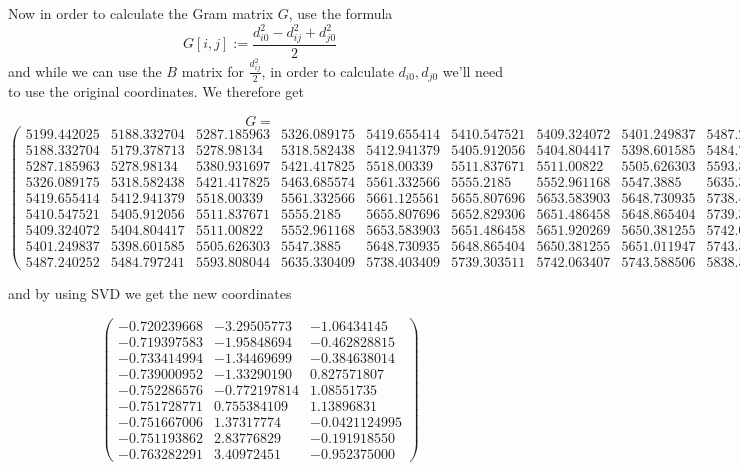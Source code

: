 \documentclass[a4paper,11pt]{article}
\begin{document}
Now in order to calculate the Gram matrix $G$, use the formula
\[
  G[i,j] := \frac{d_{i0}^2 - d_{ij}^2 + d_{j0}^2}{2}
\]
and while we can use the $B$ matrix for $\frac{d_{ij}^2}{2}$, in order to calculate $d_{i0}, d_{j0}$ we'll need to use the original coordinates. We therefore get
\begin{footnotesize}
  \[G =\]
  \[
    \begin{pmatrix}
      5199.442025 & 5188.332704 & 5287.185963 & 5326.089175 & 5419.655414 & 5410.547521 & 5409.324072 & 5401.249837 & 5487.240252\\
      5188.332704 & 5179.378713 & 5278.98134 & 5318.582438 & 5412.941379 & 5405.912056 & 5404.804417 & 5398.601585 & 5484.797241\\
      5287.185963 & 5278.98134 & 5380.931697 & 5421.417825 & 5518.00339 & 5511.837671 & 5511.00822 & 5505.626303 & 5593.808044\\
      5326.089175 & 5318.582438 & 5421.417825 & 5463.685574 & 5561.332566 & 5555.2185 & 5552.961168 & 5547.3885 & 5635.330409\\
      5419.655414 & 5412.941379 & 5518.00339 & 5561.332566 & 5661.125561 & 5655.807696 & 5653.583903 & 5648.730935 & 5738.403409\\
      5410.547521 & 5405.912056 & 5511.837671 & 5555.2185 & 5655.807696 & 5652.829306 & 5651.486458 & 5648.865404 & 5739.303511\\
      5409.324072 & 5404.804417 & 5511.00822 & 5552.961168 & 5653.583903 & 5651.486458 & 5651.920269 & 5650.381255 & 5742.063407\\
      5401.249837 & 5398.601585 & 5505.626303 & 5547.3885 & 5648.730935 & 5648.865404 & 5650.381255 & 5651.011947 & 5743.588506\\
      5487.240252 & 5484.797241 & 5593.808044 & 5635.330409 & 5738.403409 & 5739.303511 & 5742.063407 & 5743.588506 & 5838.531794
    \end{pmatrix}
  \]
\end{footnotesize}

and by using SVD we get the new coordinates
\begin{center}
  \[
    \begin{pmatrix}
      -0.720239668 & -3.29505773 & -1.06434145\\
      -0.719397583 & -1.95848694 & -0.462828815\\
      -0.733414994 & -1.34469699 & -0.384638014\\
      -0.739000952 & -1.33290190 & 0.827571807\\
      -0.752286576 & -0.772197814 & 1.08551735\\
      -0.751728771 & 0.755384109 & 1.13896831\\
      -0.751667006 & 1.37317774 & -0.0421124995\\
      -0.751193862 & 2.83776829 & -0.191918550\\
      -0.763282291 & 3.40972451 & -0.952375000
    \end{pmatrix}
  \]
\end{center}
\end{document}
